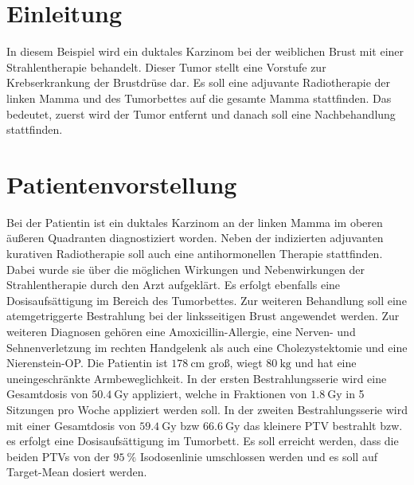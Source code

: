 \section{Einleitung}
\label{sec:Einleitung}
In diesem Beispiel wird ein duktales Karzinom bei der weiblichen Brust mit einer Strahlentherapie behandelt. Dieser Tumor stellt eine Vorstufe zur Krebserkrankung der Brustdrüse dar. \cite{Mamma}
Es soll eine adjuvante Radiotherapie der linken Mamma und des Tumorbettes auf die gesamte Mamma stattfinden. Das bedeutet, zuerst wird der Tumor entfernt und danach soll eine Nachbehandlung stattfinden.


\section{Patientenvorstellung}
\label{sec:Patientenvorstellung}
Bei der Patientin ist ein duktales Karzinom an der linken Mamma im oberen äußeren Quadranten diagnostiziert worden. Neben der indizierten adjuvanten kurativen Radiotherapie soll auch eine antihormonellen Therapie stattfinden. Dabei wurde sie über die möglichen Wirkungen und Nebenwirkungen der Strahlentherapie durch den Arzt aufgeklärt.
Es erfolgt ebenfalls eine Dosisaufsättigung im Bereich des Tumorbettes. Zur weiteren Behandlung soll eine atemgetriggerte Bestrahlung bei der linksseitigen Brust angewendet werden.
Zur weiteren Diagnosen gehören eine Amoxicillin-Allergie, eine Nerven- und Sehnenverletzung im rechten Handgelenk als auch eine Cholezystektomie und eine Nierenstein-OP.
Die Patientin ist $\SI{178}{\centi\meter}$ groß, wiegt $\SI{80}{\kilogram}$ und hat eine uneingeschränkte Armbeweglichkeit.
In der ersten Bestrahlungsserie wird eine Gesamtdosis von $\SI{50,4}{\gray}$ appliziert, welche in Fraktionen von $\SI{1,8}{\gray}$ in 5 Sitzungen pro Woche appliziert werden soll. In der zweiten Bestrahlungsserie wird mit einer Gesamtdosis von $\SI{59,4}{\gray}$ bzw $\SI{66,6}{\gray}$ das kleinere PTV bestrahlt bzw. es erfolgt eine Dosisaufsättigung im Tumorbett. Es soll erreicht werden, dass die beiden PTVs von der $\SI{95}{\percent}$ Isodosenlinie umschlossen werden und es soll auf Target-Mean dosiert werden.
